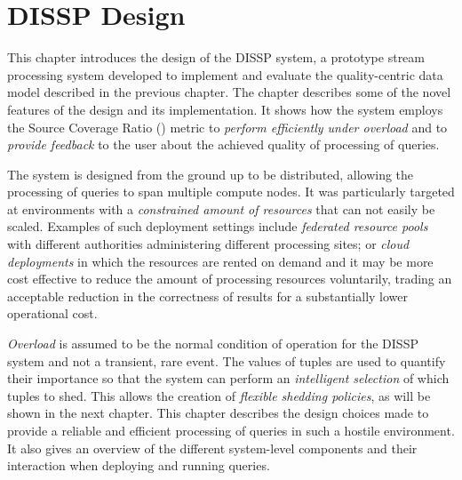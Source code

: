 \chapter{DISSP Design}
\label{ch:system_design}

This chapter introduces the design of the DISSP system, a prototype stream processing system developed to
implement and evaluate the quality-centric data model described in the previous chapter. 
The chapter describes some of the novel features of the design and its implementation.
It shows how the system employs the Source Coverage Ratio (\sic) metric to \emph{perform efficiently
under overload} and to \emph{provide feedback} to the user about the achieved quality of processing of
queries.

The system is designed from the ground up to be distributed, allowing the processing of queries to
span multiple compute nodes.
It was particularly targeted at environments with a \emph{constrained amount of resources} that can not
easily be scaled. Examples of such deployment settings include \emph{federated resource
pools} with different authorities administering different processing sites; or \emph{cloud deployments}
in which the resources are rented on demand and it may be more cost effective to reduce the
amount of processing resources voluntarily, trading an acceptable reduction in the correctness of results
for a substantially lower operational cost. 

\emph{Overload} is assumed to be the normal condition of operation for the DISSP system and not a
transient, rare event. 
The \sic values of tuples are used to quantify their importance so that the system can perform an 
\emph{intelligent selection} of which tuples to shed. This allows the creation of \emph{flexible shedding
policies}, as will be shown in the next chapter.
This chapter describes the design choices made to provide a reliable and efficient
processing of queries in such a hostile environment.
It also gives an overview of the different system-level components and their interaction when deploying
and running queries. 















	



		

